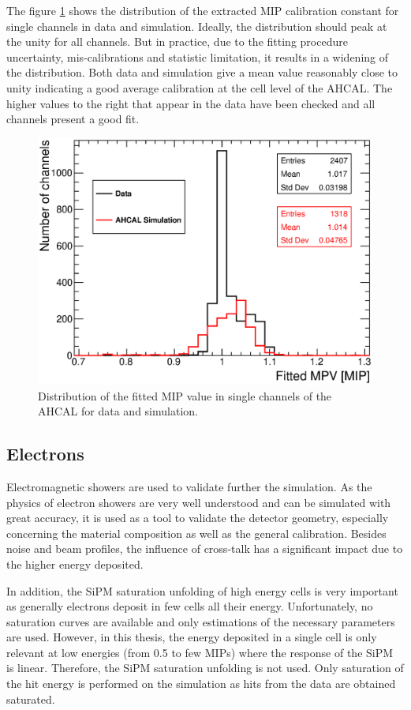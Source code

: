 The figure \ref{fig:MPVData_MC} shows the distribution of the extracted MIP calibration constant for single channels in data and simulation. Ideally, the distribution should peak at the unity for all channels. But in practice, due to the fitting procedure uncertainty, mis-calibrations and statistic limitation, it results in a widening of the distribution. Both data and simulation give a mean value reasonably close to unity indicating a good average calibration at the cell level of the AHCAL. The higher values to the right that appear in the data have been checked and all channels present a good fit.

\begin{figure}[htbp!]
	\centering
	\includegraphics[width=0.6\linewidth]{../Thesis_Plots/EnergyCalib/Plots/ComparisonMCData_MPV.eps}
	\caption{Distribution of the fitted MIP value in single channels of the AHCAL for data and simulation.} \label{fig:MPVData_MC}
\end{figure}

\subsection{Electrons}

Electromagnetic showers are used to validate further the simulation. As the physics of electron showers are very well understood and can be simulated with great accuracy, it is used as a tool to validate the detector geometry, especially concerning the material composition as well as the general calibration. Besides noise and beam profiles, the influence of cross-talk has a significant impact due to the higher energy deposited.

In addition, the SiPM saturation unfolding of high energy cells is very important as generally electrons deposit in few cells all their energy. Unfortunately, no saturation curves are available and only estimations of the necessary parameters are used. However, in this thesis, the energy deposited in a single cell is only relevant at low energies (from 0.5 to few MIPs) where the response of the SiPM is linear. Therefore, the SiPM saturation unfolding is not used. Only saturation of the hit energy is performed on the simulation as hits from the data are obtained saturated.

